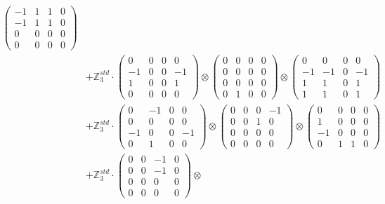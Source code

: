 \documentclass{article}
\begin{document}
{\begin{align}
            \begin{pmatrix} -1 & 1 & 1 & 0 \\ -1 & 1 & 1 & 0 \\ 0 & 0 & 0 & 0 \\ 0 & 0 & 0 & 0 \end{pmatrix} \\ 
        &+ \label{Rs16-Rc11-Solution-21-c25} \mathbb{Z}_3^{std} \cdot 
            \begin{pmatrix} 0 & 0 & 0 & 0 \\ -1 & 0 & 0 & -1 \\ 1 & 0 & 0 & 1 \\ 0 & 0 & 0 & 0 \end{pmatrix} \otimes 
            \begin{pmatrix} 0 & 0 & 0 & 0 \\ 0 & 0 & 0 & 0 \\ 0 & 0 & 0 & 0 \\ 0 & 1 & 0 & 0 \end{pmatrix} \otimes 
            \begin{pmatrix} 0 & 0 & 0 & 0 \\ -1 & -1 & 0 & -1 \\ 1 & 1 & 0 & 1 \\ 1 & 1 & 0 & 1 \end{pmatrix} \\ 
        &+ \label{Rs16-Rc11-Solution-21-c26} \mathbb{Z}_3^{std} \cdot 
            \begin{pmatrix} 0 & -1 & 0 & 0 \\ 0 & 0 & 0 & 0 \\ -1 & 0 & 0 & -1 \\ 0 & 1 & 0 & 0 \end{pmatrix} \otimes 
            \begin{pmatrix} 0 & 0 & 0 & -1 \\ 0 & 0 & 1 & 0 \\ 0 & 0 & 0 & 0 \\ 0 & 0 & 0 & 0 \end{pmatrix} \otimes 
            \begin{pmatrix} 0 & 0 & 0 & 0 \\ 1 & 0 & 0 & 0 \\ -1 & 0 & 0 & 0 \\ 0 & 1 & 1 & 0 \end{pmatrix} \\ 
        &+ \label{Rs16-Rc11-Solution-21-c27} \mathbb{Z}_3^{std} \cdot 
            \begin{pmatrix} 0 & 0 & -1 & 0 \\ 0 & 0 & -1 & 0 \\ 0 & 0 & 0 & 0 \\ 0 & 0 & 0 & 0 \end{pmatrix} \otimes 

\end{align}}
\end{document}
